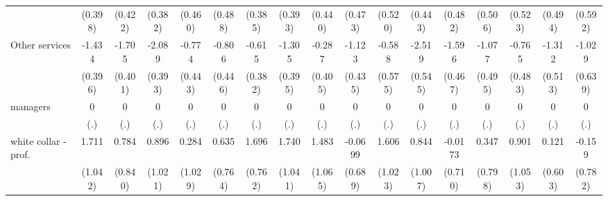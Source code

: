 {\begin{tabular}{l*{16}{c}}
                    &     (0.398)         &     (0.422)         &     (0.382)         &     (0.460)         &     (0.488)         &     (0.385)         &     (0.393)         &     (0.440)         &     (0.473)         &     (0.520)         &     (0.443)         &     (0.482)         &     (0.506)         &     (0.523)         &     (0.494)         &     (0.592)         \\
[1em]
Other services      &      -1.434\sym{***}&      -1.705\sym{***}&      -2.089\sym{***}&      -0.774         &      -0.806         &      -0.615         &      -1.305\sym{***}&      -0.287         &      -1.123\sym{**} &      -0.588         &      -2.519\sym{***}&      -1.596\sym{***}&      -1.077\sym{*}  &      -0.765         &      -1.312\sym{*}  &      -1.029         \\
                    &     (0.396)         &     (0.401)         &     (0.393)         &     (0.443)         &     (0.446)         &     (0.382)         &     (0.395)         &     (0.405)         &     (0.435)         &     (0.575)         &     (0.545)         &     (0.467)         &     (0.495)         &     (0.483)         &     (0.513)         &     (0.639)         \\
[1em]
managers            &           0         &           0         &           0         &           0         &           0         &           0         &           0         &           0         &           0         &           0         &           0         &           0         &           0         &           0         &           0         &           0         \\
                    &         (.)         &         (.)         &         (.)         &         (.)         &         (.)         &         (.)         &         (.)         &         (.)         &         (.)         &         (.)         &         (.)         &         (.)         &         (.)         &         (.)         &         (.)         &         (.)         \\
[1em]
white collar - prof.&       1.711         &       0.784         &       0.896         &       0.284         &       0.635         &       1.696\sym{*}  &       1.740         &       1.483         &     -0.0699         &       1.606         &       0.844         &     -0.0173         &       0.347         &       0.901         &       0.121         &      -0.159         \\
                    &     (1.042)         &     (0.840)         &     (1.021)         &     (1.029)         &     (0.764)         &     (0.762)         &     (1.041)         &     (1.065)         &     (0.689)         &     (1.023)         &     (1.007)         &     (0.710)         &     (0.798)         &     (1.053)         &     (0.603)         &     (0.782)         \\

\end{tabular}}
